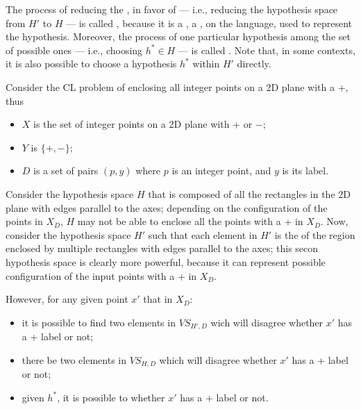 \documentclass[a4paper, 12pt]{report}
\begin{document}
    The process of reducing the , in favor of  --- i.e., reducing the hypothesis space from $H'$ to $H$ --- is called , because it is a , a , on the language, used to represent the hypothesis. Moreover, the process of  one particular hypothesis among the set of possible ones --- i.e., choosing $h^* \in H$ --- is called . Note that, in some contexts, it is also possible to choose a hypothesis $h^*$ within $H'$ directly.

    \begin{example}
        Consider the CL problem of enclosing all integer points on a 2D plane  with a +, thus

        \begin{itemize}
            \item $X$ is the set of integer points on a 2D plane  with + or $-$;
            \item $Y$ is $\{+,-\}$;
            \item $D$ is a set of pairs $(p, y)$ where $p$ is an integer point, and $y$ is its label.
        \end{itemize}

        Consider the hypothesis space $H$ that is composed of all the rectangles in the 2D plane with edges parallel to the axes; depending on the configuration of the points in $X_D$, $H$ may not be able to enclose all the points with a + in $X_D$. Now, consider the hypothesis space $H'$ such that each element in $H'$ is the  of the region enclosed by multiple rectangles with edges parallel to the axes; this secon hypothesis space is clearly more powerful, because it can represent  possible configuration of the input points with a  + in $X_D$.

        However, for any given point $x'$ that  in $X_D$:

        \begin{itemize}
            \item it is  possible to find two elements in $VS_{H', D}$ wich will disagree whether $x'$ has a + label or not;
            \item there  be two elements in $VS_{H, D}$ which will disagree whether $x'$ has a + label or not;
            \item given $h^*$, it is  possible to  whether $x'$ has a + label or not.
        \end{itemize}
    \end{example}
\end{document}
